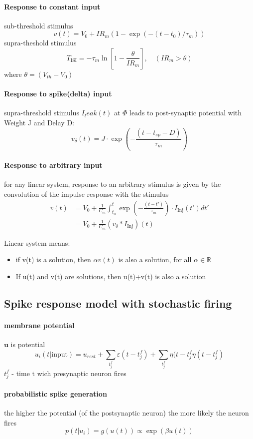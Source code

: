 \documentclass[11pt]{article}
\begin{document}
\paragraph{Response to constant input}
sub-threshold stimulus 
\[
v(t) = V_0+I R_m(1-\exp(-(t-t_0)/\tau_m))
\]
supra-theshold stimulus
\[
T_{\text{ISI}}=-\tau_m\ln\left[1-\frac{\theta}{IR_m}\right],\quad (IR_m > \theta)
\]
where $\theta=(V_{th}-V_0)$
\paragraph{Response to spike(delta) input}
supra-threshold stimulus $I_leak(t)$ at $\Phi$ leads to post-synaptic potential with Weight J and Delay D:
\[
v_\delta(t)=J\cdot \exp(-\frac{(t-t_{sp}-D)}{\tau_m})
\]

\paragraph{Response to arbitrary input}
for any linear system, response to an arbitrary stimulus is given by the convolution of the impulse response with the stimulus
\begin{align*}
	v(t)&=V_0+\frac{1}{C_m}\int^t_{t_0}\exp(-\frac{(t-t')}{\tau_m})\cdot I_{\text{Inj}}(t')dt'\\
	&=V_0+\frac{1}{C_m}(v_\delta * I_{\text{Inj}})(t)
\end{align*}

Linear system means:
\begin{itemize}
\item if v(t) is a solution, then $\alpha v(t)$ is also a solution, for all $\alpha \in \mathbb{R}$
\item If u(t) and v(t) are solutions, then u(t)+v(t) is also a solution
\end{itemize}

\subsection{Spike response model with stochastic firing}
\paragraph{membrane potential} $\mathbf{u}$ is potential
\[
	u_i(t\vert \text{input}) = u_{rest}+\sum_{t_j^f}\varepsilon(t-t_j^f)+\sum_{t_j^f}\eta(t-t_j^f\eta(t-t_j^f)
\]
$t_j^f$ - time t wich presynaptic neuron fires

\paragraph{probabilistic spike generation}
the higher the potential (of the postsynaptic neuron) the more likely the neuron fires
\[
p(t\vert u_i)=g(u(t)) \propto \exp(\beta u(t))
\]
\end{document}
